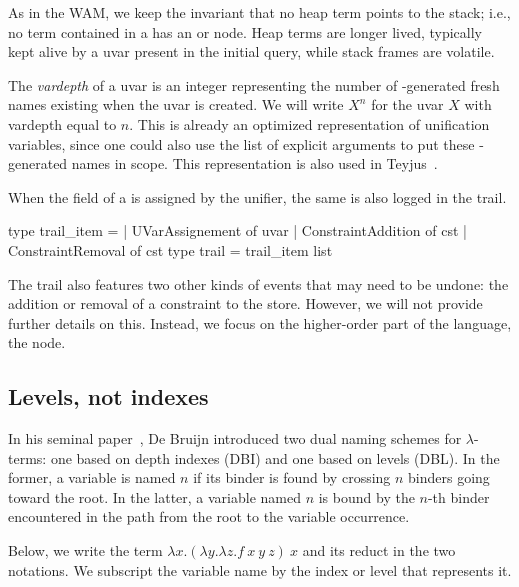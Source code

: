 \documentclass[a4paper, 11pt]{book}
\begin{document}
As in the WAM, we keep the invariant that no heap term points to the stack;
i.e., no term contained in a  has an  or
 node. Heap terms are longer lived, typically kept alive by a
uvar present in the initial query, while stack frames are volatile.


The \emph{vardepth} of a uvar is an integer representing the number of
-generated fresh names existing when the uvar is created. We will
write $X^n$ for the uvar $X$ with vardepth equal to $n$. This is already an
optimized representation of unification variables, since one could also use
the list of explicit arguments to put these -generated names in
scope. This representation is also used in
Teyjus~\cite{DBLP:journals/corr/abs-0911-5203}.


When the  field of a  is assigned by the unifier,
the same  is also logged in the trail.

\begin{ocamlcode}
type trail_item =
| UVarAssignement of uvar
| ConstraintAddition of cst
| ConstraintRemoval  of cst
type trail = trail_item list
\end{ocamlcode}

\noindent

The trail also features two other kinds of events that may need to be undone:
the addition or removal of a constraint to the store. However, we will not
provide further details on this. Instead, we focus on the higher-order part of
the language, the  node.

\subsection{Levels, not indexes}\label{sec:dbl}


In his seminal paper~\cite{DEBRUIJN1994375}, De Bruijn introduced two dual
naming schemes for $\lambda$-terms: one based on depth indexes (DBI) and one
based on levels (DBL). In the former, a variable is named $n$ if its binder is
found by crossing $n$ binders going toward the root. In the latter, a variable
named $n$ is bound by the $n$-th binder encountered in the path from the root
to the variable occurrence.


Below, we write the term $\lambda x.(\lambda y.\lambda z.f\ x\ y\ z)\ x$ and its
reduct in the two notations. We subscript the variable name by the index or
level that represents it.\\
\end{document}

